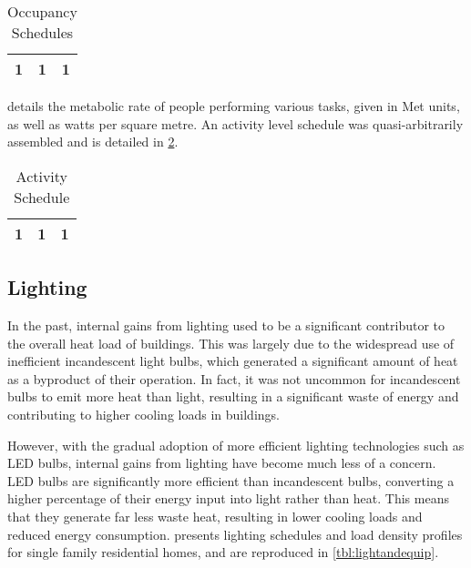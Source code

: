 \begin{table}[htb]
    \centering
    \caption{Occupancy Schedules}
    \label{tbl:occupancysched}
    \begin{tabular}
        {lcr}
        \toprule
        1&1&1\\
        \bottomrule
    \end{tabular}
\end{table}

 \cite{ashrae_ansiashrae_2010} details the metabolic rate of people performing various tasks, given in Met units, as well as watts per square metre. An activity level schedule was quasi-arbitrarily assembled and is detailed in \cref{tbl:activitysched}.

\begin{table}[htb]
    \centering
    \caption{Activity Schedule}
    \label{tbl:activitysched}
    \begin{tabular}
        {lcr}
        \toprule
        1&1&1\\
        \bottomrule
    \end{tabular}
\end{table}

\subsection{Lighting}
In the past, internal gains from lighting used to be a significant contributor to the overall heat load of buildings. This was largely due to the widespread use of inefficient incandescent light bulbs, which generated a significant amount of heat as a byproduct of their operation. In fact, it was not uncommon for incandescent bulbs to emit more heat than light, resulting in a significant waste of energy and contributing to higher cooling loads in buildings.

However, with the gradual adoption of more efficient lighting technologies such as LED bulbs, internal gains from lighting have become much less of a concern. LED bulbs are significantly more efficient than incandescent bulbs, converting a higher percentage of their energy input into light rather than heat. This means that they generate far less waste heat, resulting in lower cooling loads and reduced energy consumption.  presents lighting schedules and load density profiles for single family residential homes, and are reproduced in \cref{tbl:lightandequip}. 

